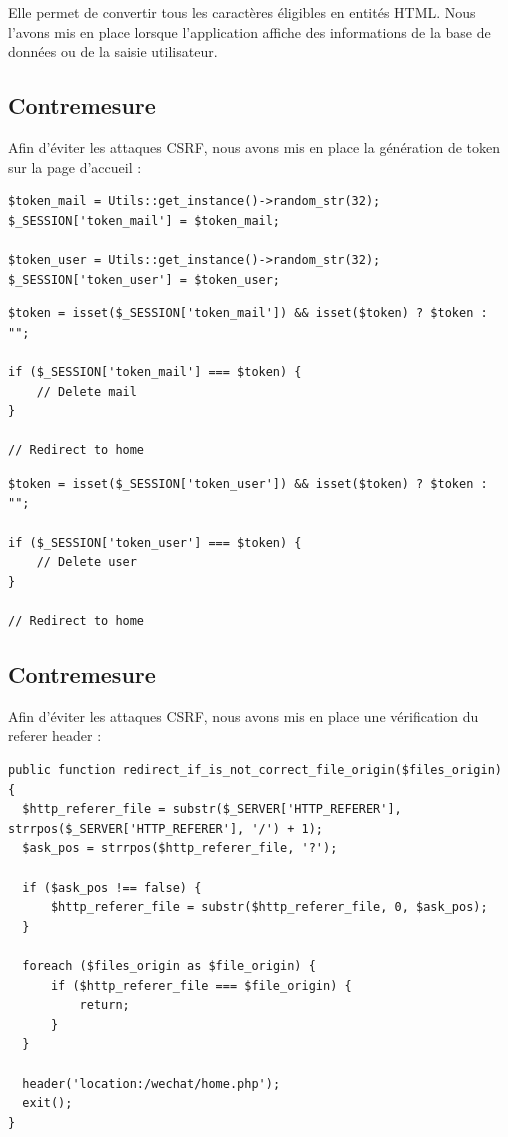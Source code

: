 \documentclass[12pt]{article}
\begin{document}
Elle permet de convertir tous les caractères éligibles en entités HTML. Nous l'avons mis en place lorsque l'application affiche des informations de la base de données ou de la saisie utilisateur. 

\subsection{Contremesure}\label{c3}

Afin d'éviter les attaques CSRF, nous avons mis en place la génération de token sur la page d'accueil :

\begin{lstlisting}[style=JAVA]
$token_mail = Utils::get_instance()->random_str(32);
$_SESSION['token_mail'] = $token_mail;

$token_user = Utils::get_instance()->random_str(32);
$_SESSION['token_user'] = $token_user;
\end{lstlisting}

\begin{lstlisting}[style=JAVA]
$token = isset($_SESSION['token_mail']) && isset($token) ? $token : "";

if ($_SESSION['token_mail'] === $token) {
    // Delete mail
}

// Redirect to home
\end{lstlisting}

\begin{lstlisting}[style=JAVA]
$token = isset($_SESSION['token_user']) && isset($token) ? $token : "";

if ($_SESSION['token_user'] === $token) {
    // Delete user
}

// Redirect to home
\end{lstlisting}

\subsection{Contremesure}\label{c4}

Afin d'éviter les attaques CSRF, nous avons mis en place une vérification du referer header :

\begin{lstlisting}[style=JAVA]
public function redirect_if_is_not_correct_file_origin($files_origin) {
  $http_referer_file = substr($_SERVER['HTTP_REFERER'], strrpos($_SERVER['HTTP_REFERER'], '/') + 1);
  $ask_pos = strrpos($http_referer_file, '?');

  if ($ask_pos !== false) {
      $http_referer_file = substr($http_referer_file, 0, $ask_pos);
  }
  
  foreach ($files_origin as $file_origin) {
      if ($http_referer_file === $file_origin) {
          return;
      }
  }

  header('location:/wechat/home.php');
  exit();
}
\end{lstlisting}
\end{document}
